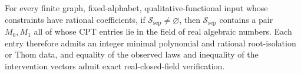 For every finite graph, fixed-alphabet, qualitative-functional input whose constraints have rational coefficients, if \(\mathcal S_{\mathrm{sep}}\ne\varnothing\), then \(\mathcal S_{\mathrm{sep}}\) contains a pair \(M_0,M_1\) all of whose CPT entries lie in the field of real algebraic numbers. Each entry therefore admits an integer minimal polynomial and rational root-isolation or Thom data, and equality of the observed laws and inequality of the intervention vectors admit exact real-closed-field verification.
